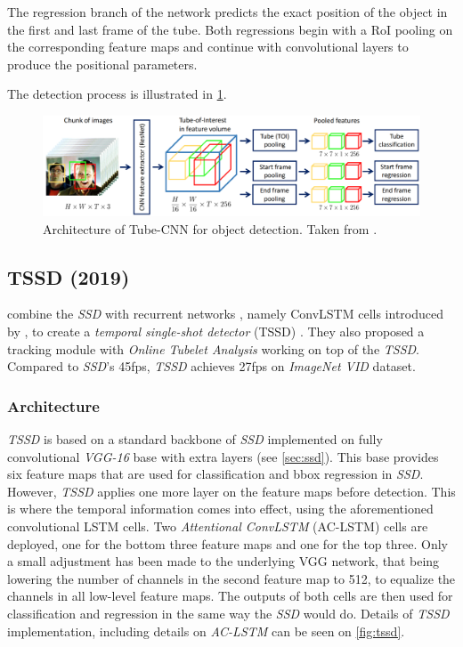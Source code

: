 The regression branch of the network predicts the exact position of the object in the first and last frame of the tube. Both regressions begin with a RoI pooling on the corresponding feature maps and continue with convolutional layers to produce the positional parameters. 

The detection process is illustrated in \cref{fig:tubecnn}.


\begin{figure}
    \centering
    \includegraphics[width=\textwidth]{img/tubecnn}
    \caption[Tube-CNN architecture]%
    {Architecture of Tube-CNN for object detection. Taken from \cite[fig.~2]{bib:tubeCNN}.}
    \label{fig:tubecnn}
\end{figure}


\subsection{TSSD (2019)}
\label{tssd}
\citeauthor{bib:tssd} combine the \textit{SSD} with recurrent networks \cite[chpt.~10]{bib:dlbook}, namely ConvLSTM cells introduced by \citeauthor{bib:convlstm} \cite{bib:convlstm}, to create a \textit{temporal single-shot detector} (TSSD) \cite{bib:tssd}. They also proposed a tracking module with \textit{Online Tubelet Analysis} working on top of the \textit{TSSD}.
Compared to \textit{SSD}'s 45fps, \textit{TSSD} achieves 27fps on \textit{ImageNet VID} dataset.  

\subsubsection{Architecture}
\textit{TSSD} is based on a standard backbone of \textit{SSD} implemented on fully convolutional \textit{VGG-16} base with extra layers (see \cref{sec:ssd}). This base provides six feature maps that are used for classification and bbox regression in \textit{SSD}. However, \textit{TSSD} applies one more layer on the feature maps before detection. This is where the temporal information comes into effect, using the aforementioned convolutional LSTM cells. Two \textit{Attentional ConvLSTM} (AC-LSTM) cells are deployed, one for the bottom three feature maps and one for the top three. Only a small adjustment has been made to the underlying VGG network, that being lowering the number of channels in the second feature map to 512, to equalize the channels in all low-level feature maps. The outputs of both cells are then used for classification and regression in the same way the \textit{SSD} would do. Details of \textit{TSSD} implementation, including details on \textit{AC-LSTM} can be seen on \cref{fig:tssd}. 

